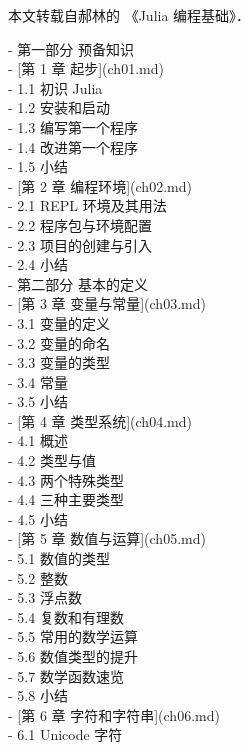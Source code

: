 
本文转载自郝林的 《Julia 编程基础》．


- 第一部分 预备知识 \\
    - [第 1 章 起步](ch01.md) \\
        - 1.1 初识 Julia \\
        - 1.2 安装和启动 \\
        - 1.3 编写第一个程序 \\
        - 1.4 改进第一个程序 \\
        - 1.5 小结 \\
    - [第 2 章 编程环境](ch02.md) \\
        - 2.1 REPL 环境及其用法 \\
        - 2.2 程序包与环境配置 \\
        - 2.3 项目的创建与引入 \\
        - 2.4 小结 \\
- 第二部分 基本的定义 \\
    - [第 3 章 变量与常量](ch03.md) \\
        - 3.1 变量的定义 \\
        - 3.2 变量的命名 \\
        - 3.3 变量的类型 \\
        - 3.4 常量 \\
        - 3.5 小结 \\
    - [第 4 章 类型系统](ch04.md) \\
        - 4.1 概述 \\
        - 4.2 类型与值 \\
        - 4.3 两个特殊类型 \\
        - 4.4 三种主要类型 \\
        - 4.5 小结 \\
    - [第 5 章 数值与运算](ch05.md) \\
        - 5.1 数值的类型 \\
        - 5.2 整数 \\
        - 5.3 浮点数 \\
        - 5.4 复数和有理数 \\
        - 5.5 常用的数学运算 \\
        - 5.6 数值类型的提升 \\
        - 5.7 数学函数速览 \\
        - 5.8 小结 \\
    - [第 6 章 字符和字符串](ch06.md) \\
        - 6.1 Unicode 字符 \\
